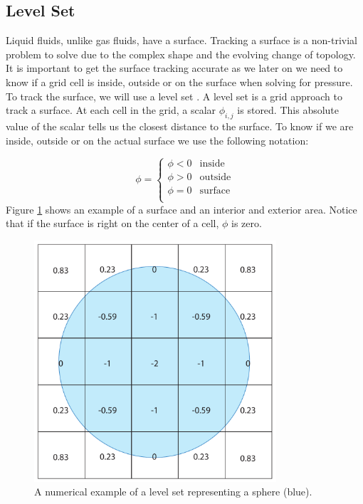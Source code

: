 \subsection{Level Set}

Liquid fluids, unlike gas fluids, have a surface. Tracking a surface is a non-trivial problem to solve due to the complex shape and the evolving change of topology. It is important to get the surface tracking accurate as we later on we need to know if a grid cell is inside, outside or on the surface when solving for pressure. To track the surface, we will use a level set \cite{osher}. A level set is a grid approach to track a surface. At each cell in the grid, a scalar $\phi_{i,j}$ is stored. This absolute value of the scalar tells us the closest distance to the surface. To know if we are inside, outside or on the actual surface we use the following notation:

\begin{equation}
\phi = 
\left\{
\begin{array}{ll}
\phi < 0 & \mbox{inside}  \\
\phi > 0 & \mbox{outside} \\
\phi = 0 & \mbox{surface} \\
\end{array}
\right.
\end{equation}
\noindent
Figure \ref{levetsetexample} shows an example of a surface and an interior and exterior area. Notice that if the surface is right on the center of a cell, $\phi$ is zero. 

\begin{figure}[ht!]
\centering
\includegraphics[width=90mm]{img/levelset.pdf}
\caption{A numerical example of a level set representing a sphere (blue).}
\label{levetsetexample}
\end{figure}

